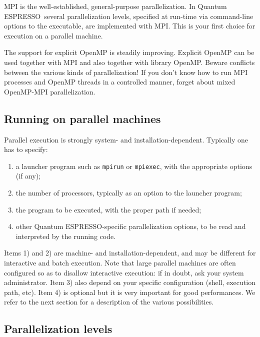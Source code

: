 \documentclass[12pt,a4paper]{article}
\def\qe{{\sc Quantum ESPRESSO}}
\begin{document}
MPI is the well-established, general-purpose parallelization.
In \qe\ several parallelization levels, specified at run-time
via command-line options to the executable, are implemented
with MPI. This is your first choice for execution on a parallel
machine.

The support for explicit OpenMP is steadily improving.
Explicit OpenMP can be used together with MPI and also
together with library OpenMP. Beware
conflicts between the various kinds of parallelization!
If you don't know how to run MPI processes
and OpenMP threads in a controlled manner, forget about mixed
OpenMP-MPI parallelization.

\subsection{Running on parallel machines}

Parallel execution is strongly system- and installation-dependent.
Typically one has to specify:
\begin{enumerate}
\item a launcher program such as \texttt{mpirun} or \texttt{mpiexec},
  with the  appropriate options (if any);
\item the number of processors, typically as an option to the launcher
  program;
\item the program to be executed, with the proper path if needed;
\item other \qe-specific parallelization options, to be
  read and interpreted by the running code.
\end{enumerate}
Items 1) and 2) are machine- and installation-dependent, and may be
different for interactive and batch execution. Note that large
parallel machines are  often configured so as to disallow interactive
execution: if in doubt, ask your system administrator.
Item 3) also depend on your specific configuration (shell, execution path, etc).
Item 4) is optional but it is very important
for good performances. We refer to the next
section for a description of the various
possibilities.

\subsection{Parallelization levels}
\end{document}
